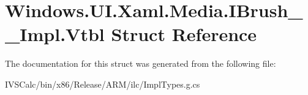 \hypertarget{struct_windows_1_1_u_i_1_1_xaml_1_1_media_1_1_i_brush_____impl_1_1_vtbl}{}\section{Windows.\+U\+I.\+Xaml.\+Media.\+I\+Brush\+\_\+\+\_\+\+Impl.\+Vtbl Struct Reference}
\label{struct_windows_1_1_u_i_1_1_xaml_1_1_media_1_1_i_brush_____impl_1_1_vtbl}


The documentation for this struct was generated from the following file\+:\begin{DoxyCompactItemize}
\item 
I\+V\+S\+Calc/bin/x86/\+Release/\+A\+R\+M/ilc/Impl\+Types.\+g.\+cs\end{DoxyCompactItemize}
